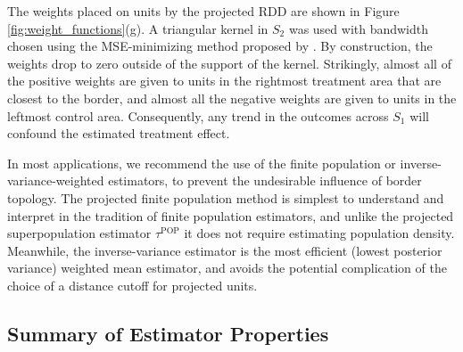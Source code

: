 \documentclass[letter]{article}
\newcommand{\taupop}{\tau^{\mathrm{POP}}}
\renewcommand{\cite}[1]{\citep{#1}}
\begin{document}
The weights placed on units by the projected RDD are shown in Figure \ref{fig:weight_functions}(g).
A triangular kernel in \(S_2\) was used with bandwidth chosen using the MSE-minimizing method proposed by \cite{imbens2012optimal}.
By construction, the weights drop to zero outside of the support of the kernel.
Strikingly, almost all of the positive weights are given to units in the rightmost treatment area that are closest to the border, and almost all the negative weights are given to units in the leftmost control area.
Consequently, any trend in the outcomes across \(S_1\) will confound the estimated treatment effect.

In most applications, we recommend the use of the finite population or inverse-variance-weighted estimators, to prevent the undesirable influence of border topology.
The projected finite population method is simplest to understand and interpret in the tradition of finite population estimators, and unlike the projected superpopulation estimator \(\taupop\) it does not require estimating population density.
Meanwhile, the inverse-variance estimator is the most efficient (lowest posterior variance) weighted mean estimator,
and avoids the potential complication of the choice of a distance cutoff for projected units.
    


    	\subsection{Summary of Estimator Properties}\label{summary-of-estimator-properties}
\end{document}
